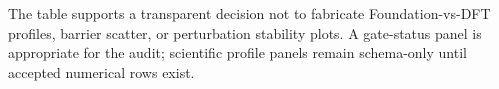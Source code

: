 The table supports a transparent decision not to fabricate Foundation-vs-DFT profiles, barrier scatter, or perturbation stability plots. A gate-status panel is appropriate for the audit; scientific profile panels remain schema-only until accepted numerical rows exist.
